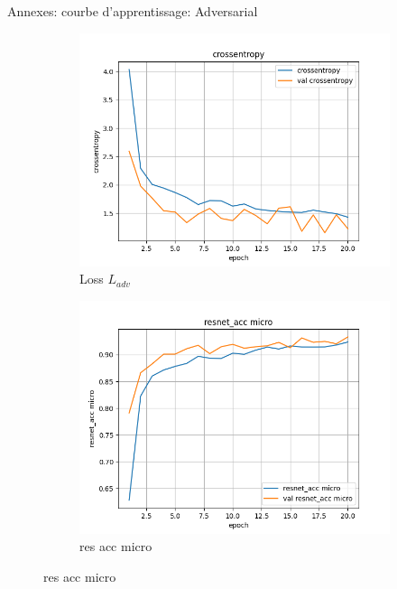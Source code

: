 \documentclass[11pt]{beamer}
\begin{document}
\begin{frame}{Annexes: courbe d'apprentissage: Adversarial}
    \begin{figure}[ht]
        \centering
        \begin{subfigure}{0.32\textwidth}
            \centering
            \includegraphics[width=\linewidth]{../logs/adv_img256_1/crossentropy.png}
            \caption{Loss $L_{adv}$}
        \end{subfigure}
        \begin{subfigure}{0.32\textwidth}
            \centering
            \includegraphics[width=\linewidth]{../logs/adv_img256_1/resnet_acc micro.png}
            \caption{res acc micro}
        \end{subfigure}

\end{figure}
\end{frame}
\end{document}
